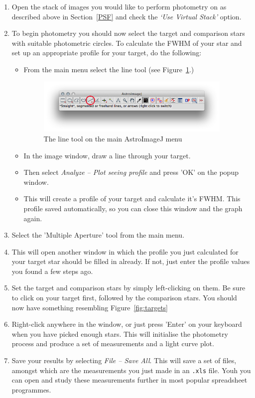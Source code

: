 \documentclass[12pt,twoside,a4paper]{report}
\begin{document}
\begin{enumerate}
 \item Open the stack of images you would like to perform photometry on as described above in Section~\ref{PSF} and check the \emph{`Use Virtual Stack'} option.
 \item To begin photometry you should now select the target and comparison stars with suitable photometric circles. To calculate the FWHM of your star and set up an appropriate profile for your target, do the following:

  \begin{itemize}
   \item From the main menu select the line tool (see Figure~\ref{fig:linetool}.)

  \begin{figure}[ht]
  \centering
    \includegraphics[width=0.94\textwidth]{documentation_images/AIJlinetool.jpg}
    \caption{\label{fig:linetool}The line tool on the main AstroImageJ menu}
 \end{figure}

   \item In the image window, draw a line through your target.
   \item Then select \emph{Analyze -- Plot seeing profile} and press 'OK' on the popup window.
   \item This will create a profile of your target and calculate it's FWHM. This profile saved automatically, so you can close this window and the graph again.
  \end{itemize}

 \item Select the 'Multiple Aperture' tool from the main menu.
 \item This will open another window in which the profile you just calculated for your target star should be filled in already. If not, just enter the profile values you found a few steps ago.
 \item Set the target and comparison stars by simply left-clicking on them. Be sure to click on your target first, followed by the comparison stars. You should now have something resembling Figure~\ref{fig:targets}
 \item Right-click anywhere in the window, or just press 'Enter' on your keyboard when you have picked enough stars. This will initialise the photometry process and produce a set of measurements and a light curve plot.
 \item Save your results by selecting \emph{File -- Save All}. This will save a set of files, amongst which are the measurements you just made in an {\tt .xls} file. Youh you can open and study these measurements further in most popular spreadsheet programmes.


\end{enumerate}
\end{document}
